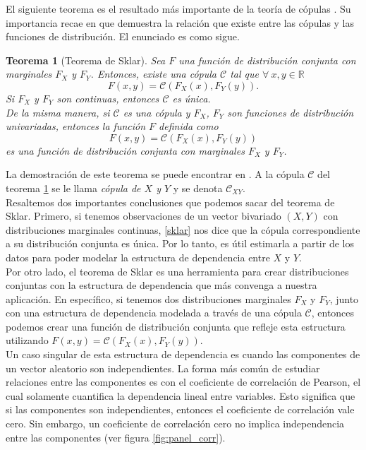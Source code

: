 \documentclass[11pt,a4paper]{article}
\newcommand{\R}{\mathbb{R}}
\newcommand{\C}{\mathcal{C}}
\newtheorem{theorem}{Teorema}[section]
\begin{document}
El siguiente teorema es el resultado más importante de la teoría de cópulas \citep{copula_modeling}. Su importancia recae en que demuestra la relación que existe entre las cópulas y las funciones de distribución. El enunciado es como sigue.\\

\begin{theorem}[Teorema de Sklar]
\label{sklar}
Sea $F$ una función de distribución conjunta con marginales $F_X$ y $F_Y$. Entonces, existe una cópula $\C$ tal que $\forall \ x,y \in \R$ $$F(x,y) = \C(F_X(x), F_Y(y)).$$ Si $F_X$ y $F_Y$ son continuas, entonces $\C$ es única.\\

De la misma manera, si $\C$ es una cópula y $F_X$, $F_Y$ son funciones de distribución univariadas, entonces la función $F$ definida como $$F(x, y) = \C(F_X(x), F_Y(y))$$ es una función de distribución conjunta con marginales $F_X$ y $F_Y$.\\
\end{theorem}

La demostración de este teorema se puede encontrar en \citet{nelsen}. A la cópula $\C$ del teorema \ref{sklar} se le llama \textit{cópula de $X$ y $Y$} y se denota $\C_{XY}$.\\

Resaltemos dos importantes conclusiones que podemos sacar del teorema de Sklar. Primero, si tenemos observaciones de un vector bivariado $(X, Y)$ con distribuciones marginales continuas, \eqref{sklar} nos dice que la cópula correspondiente a su distribución conjunta es única. Por lo tanto, es útil estimarla a partir de los datos para poder modelar la estructura de dependencia entre $X$ y $Y$.\\

Por otro lado, el teorema de Sklar es una herramienta para crear distribuciones conjuntas con la estructura de dependencia que más convenga a nuestra aplicación. En específico, si tenemos dos distribuciones marginales $F_X$ y $F_Y$, junto con una estructura de dependencia modelada a través de una cópula $\C$, entonces podemos crear una función de distribución conjunta que refleje esta estructura utilizando $F(x, y) = \C (F_X(x), F_Y(y))$.\\

Un caso singular de esta estructura de dependencia es cuando las componentes de un vector aleatorio son independientes. La forma más común de estudiar relaciones entre las componentes es con el coeficiente de correlación de Pearson, el cual solamente cuantifica la dependencia lineal entre variables. Esto significa que si las componentes son independientes, entonces el coeficiente de correlación vale cero. Sin embargo, un coeficiente de correlación cero no implica independencia entre las componentes (ver figura \ref{fig:panel_corr}).\\
\end{document}
